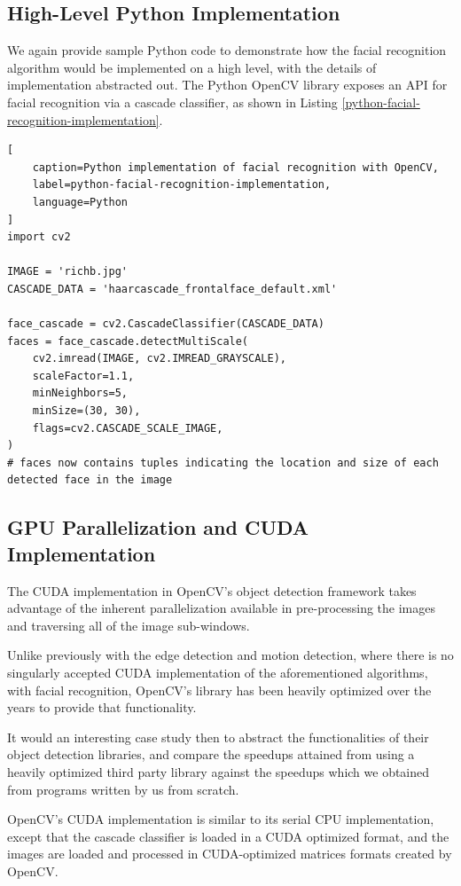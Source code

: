 \documentclass[journal]{IEEEtran}
\begin{document}
\subsection{High-Level Python Implementation}
We again provide sample Python code to demonstrate how the facial recognition algorithm would be implemented on a high level, with the details of implementation abstracted out. The Python OpenCV library exposes an API for facial recognition via a cascade classifier, as shown in Listing \ref{python-facial-recognition-implementation}.
\begin{lstlisting}[
	caption=Python implementation of facial recognition with OpenCV,
	label=python-facial-recognition-implementation,
	language=Python
]
import cv2

IMAGE = 'richb.jpg'
CASCADE_DATA = 'haarcascade_frontalface_default.xml'

face_cascade = cv2.CascadeClassifier(CASCADE_DATA)
faces = face_cascade.detectMultiScale(
	cv2.imread(IMAGE, cv2.IMREAD_GRAYSCALE),
	scaleFactor=1.1,
	minNeighbors=5,
	minSize=(30, 30),
	flags=cv2.CASCADE_SCALE_IMAGE,
)
# faces now contains tuples indicating the location and size of each detected face in the image
\end{lstlisting}


\subsection{GPU Parallelization and CUDA Implementation}
The CUDA implementation in OpenCV's object detection framework takes advantage of the inherent parallelization available in pre-processing the images and traversing all of the image sub-windows.
\par Unlike previously with the edge detection and motion detection, where there is no singularly accepted CUDA implementation of the aforementioned algorithms, with facial recognition, OpenCV's library has been heavily optimized over the years to provide that functionality.
\par It would an interesting case study then to abstract the functionalities of their object detection libraries, and compare the speedups attained from using a heavily optimized third party library against the speedups which we obtained from programs written by us from scratch.
\par OpenCV's CUDA implementation is similar to its serial CPU implementation, except that the cascade classifier is loaded in a CUDA optimized format, and the images are loaded and processed in CUDA-optimized matrices formats created by OpenCV. 
\end{document}
